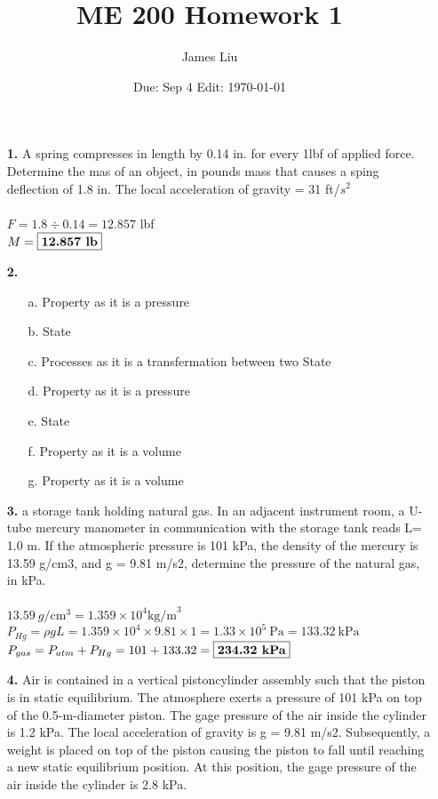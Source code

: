 \documentclass{article}
\date{Due: Sep 4  Edit: \today}
\title{ME 200 Homework 1}
\author{James Liu}
\begin{document}
\maketitle
\begin{itemize}
    \item [\textbf{1.}] A spring compresses in length by 0.14 in. for every 1lbf of applied force. Determine the mas of an object, in pounds mass that causes a sping deflection of 1.8 in. The local acceleration of gravity = 31 ft/\(s^2\)
    \\
    \\
    \(F = 1.8\div0.14 = 12.857\) lbf\\
    \(M = \fbox{\textbf{12.857 \text{lb}}}\)
    \\
    \item [\textbf{2.}] \ 
    \\
    \begin{itemize}
        \item [a.] Property as it is a pressure
        \item [b.] State
        \item [c.] Processes as it is a transfermation between two State
        \item [d.] Property as it is a pressure
        \item [e.] State
        \item [f.] Property as it is a volume
        \item [g.] Property as it is a volume
    \end{itemize}
    \item [\textbf{3.}]a storage tank holding natural
    gas. In an adjacent instrument room, a U-tube mercury manometer in communication with the storage tank reads L= 1.0 m. If the atmospheric pressure is 101 kPa, the density of the mercury is 13.59 g/cm3, and g = 9.81 m/s2, determine the pressure of the natural gas, in kPa.
    \\
    \\
    \(13.59 \ g/\text{cm}^3=1.359\times 10^4  \text{kg/m}^3\)\\
    \(P_{Hg}=\rho g L = 1.359\times 10^4 \times 9.81 \times 1 = 1.33\times10^5 \ \text{Pa}=133.32\ \text{kPa}\) \\
    \(P_{gas} = P_{atm}+P_{Hg}=101+133.32=\fbox{\textbf{234.32\ \text{kPa}}}\)
    \newpage
    \item [\textbf{4.}]Air is contained in a vertical pistoncylinder assembly such that the piston is in static equilibrium. The atmosphere exerts a pressure of 101 kPa on top of the 0.5-m-diameter piston. The gage pressure of the air inside the cylinder is 1.2 kPa. The local acceleration of gravity is g = 9.81 m/s2. Subsequently, a weight is placed on top of the piston causing the piston to fall until reaching a new static equilibrium position. At this position, the gage pressure of the air inside the cylinder is 2.8 kPa.

\end{itemize}
\end{document}
